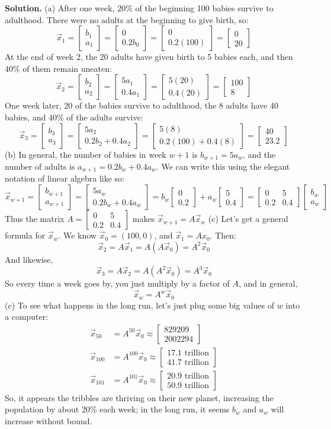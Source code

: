 \documentclass[11pt, letterpaper]{report}
\newenvironment{book}{}{}
\newcommand{\bbvec}[2]{
  \begin{bmatrix} #1 \\ #2 \end{bmatrix}
}
\begin{document}
\begin{book}
\textbf{Solution.} (a) After one week, 20\% of the beginning 100 babies survive to adulthood. There were no adults at the beginning to give birth, so: 
\[\vec{x}_1=\bbvec{b_1}{a_1} = \bbvec{0}{0.2b_0}=\bbvec{0}{0.2(100)} = \bbvec{0}{20}\]
At the end of week 2, the 20 adults have given birth to 5 babies each, and then 40\% of them remain uneaten:
\[\vec{x}_2=\bbvec{b_2}{a_2} = \bbvec{5a_{1}}{0.4a_1}=\bbvec{5(20)}{0.4(20)} = \bbvec{100}{8} \]
One week later, 20 of the babies survive to adulthood, the 8 adults have 40 babies, and 40\% of the adults survive:
\[\vec{x}_3=\bbvec{b_3}{a_3} = \bbvec{5a_{2}}{0.2b_2+0.4a_2} = \bbvec{5(8)}{0.2(100)+0.4(8)} = \bbvec{40}{23.2} \]
(b) In general, the number of babies in week $w+1$ is $b_{w+1}=5a_w$, and the number of adults is $a_{w+1}=0.2b_w+0.4a_w$. We can write this using the elegant notation of linear algebra like so:
\[ \vec{x}_{w+1}=\bbvec{b_{w+1}}{a_{w+1}} = \bbvec{5a_w}{0.2b_w+0.4a_w} = b_w\bbvec{0}{0.2} + a_w \bbvec{5}{0.4} = \begin{bmatrix}
0 & 5 \\
0.2 & 0.4
\end{bmatrix}\bbvec{b_w}{a_w}\]
Thus the matrix $A = \begin{bmatrix}
0 & 5 \\
0.2 & 0.4
\end{bmatrix}$ makes $\vec{x}_{w+1}=A\vec{x}_w$
(c) Let's get a general formula for $\vec{x}_w$. We know $\vec{x}_0=(100,0)$, and $\vec{x}_1=Ax_0$. Then:
\[\vec{x}_2=A\vec{x}_1=A ( A\vec{x}_0 ) = A^{2}\vec{x}_0\]
And likewise,
\[ \vec{x}_3=A\vec{x}_2=A(A^2\vec{x}_0) = A^3\vec{x}_0\]
So every time a week goes by, you just multiply by a factor of $A$, and in general,
\[ \vec{x}_w=A^w\vec{x}_0\]
(c) To see what happens in the long run, let's just plug some big values of $w$ into a computer:
\begin{align*}
\vec{x}_{50}&=A^{50}\vec{x}_{0} \approx \bbvec{829209}{2002294}\\
\vec{x}_{100}&=A^{100}\vec{x}_{0} \approx \bbvec{17.1 \text{ trillion}}{41.7 \text{ trillion}}\\
\vec{x}_{101}&=A^{101}\vec{x}_{0} \approx \bbvec{20.9 \text{ trillion}}{50.9 \text{ trillion}}
\end{align*}
So, it appears the tribbles are thriving on their new planet, increasing the population by about 20\% each week; in the long run, it seems $b_w$ and $a_w$ will increase without bound. \blacksquare
\end{book}
\end{document}
